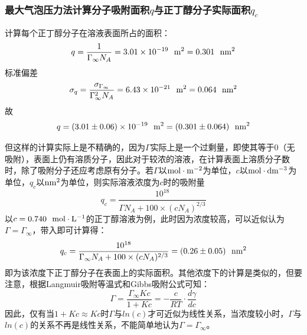 \documentclass[12pt]{article}
\begin{document}
			\subsubsection{最大气泡压力法计算分子吸附面积$q$与正丁醇分子实际面积$q_{c}$}
			计算每个正丁醇分子在溶液表面所占的面积：
			$$
			q=\frac{1}{\Gamma_{\infty}N_{A}}=3.01\times 10^{-19}\ \ {\rm m^{2}}=0.301\ \ {\rm nm^{2}}
			$$
			标准偏差
			$$
			\sigma_{q}=\frac{\sigma_{\Gamma_{\infty}}}{\Gamma^{2}_{\infty} N_{A}}=6.43\times 10^{-21}\ \ {\rm m^{2}}=0.064\ \ {\rm nm^{2}}
			$$
			故
			$$
			q=(3.01\pm 0.06)\times 10^{-19}\ \ {\rm m^{2}}=(0.301\pm 0.064)\ \ {\rm nm^{2}}
			$$
			\par 
			但这样的计算实际上是不精确的，因为$\Gamma$实际上是一个过剩量，即使其等于0（无吸附），表面上仍有溶质分子，因此对于较浓的溶液，在计算表面上溶质分子数时，除了吸附分子还应考虑原有分子。若$\Gamma$以$\rm mol\cdot m^{-2}$为单位，$c$以$\rm mol\cdot dm^{-3}$为单位，$q_{c}$以$\rm nm^{2}$为单位，则实际溶液浓度为$c$时的吸附量
			$$
			q_{c}=\frac{10^{18}}{\Gamma N_{A}+100\times(cN_{A})^{2/3}}
			$$
			以$c=0.740\ \ {\rm mol\cdot L^{-1}}$的正丁醇溶液为例，此时因为浓度较高，可以近似认为$\Gamma=\Gamma_{\infty}$，带入即可计算得：
			$$
			q_{c}=\frac{10^{18}}{\Gamma_{\infty} N_{A}+100\times(cN_{A})^{2/3}}=(0.26\pm 0.05)\ \ {\rm nm^{2}}
			$$
			即为该浓度下正丁醇分子在表面上的实际面积。其他浓度下的计算是类似的，但要注意，根据Langmuir吸附等温式和Gibbs吸附公式可知：
			$$
			\Gamma = \frac{\Gamma_{\infty} Kc}{1+Kc} = -\frac{c}{RT}\cdot\frac{d\gamma}{dc}
			$$
			因此，仅有当$1+Kc\approx Kc$时$\Gamma$与$ln(c)$才可近似为线性关系，当浓度较小时，$\Gamma$与$ln(c)$的关系不再是线性关系，不能简单地认为$\Gamma=\Gamma_{\infty}$。

			\vbox{}
\end{document}
